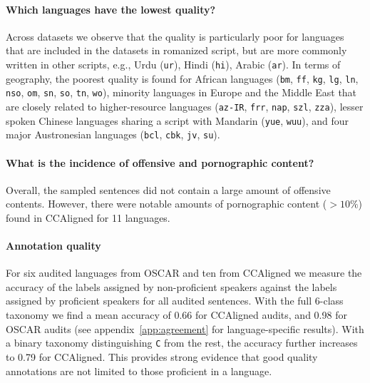 \paragraph{Which languages have the lowest quality?} Across datasets we observe that the quality is particularly poor for languages that are included in the datasets in romanized script, but are more commonly written in other scripts, e.g., Urdu (\texttt{ur}), Hindi (\texttt{hi}), Arabic (\texttt{ar}). %
In terms of geography, the poorest quality is found for African languages (\texttt{bm}, \texttt{ff}, \texttt{kg}, \texttt{lg}, \texttt{ln}, \texttt{nso}, \texttt{om}, \texttt{sn}, \texttt{so}, \texttt{tn}, \texttt{wo}), minority languages in Europe and the Middle East that are closely related to higher-resource languages (\texttt{az-IR}, \texttt{frr}, \texttt{nap}, \texttt{szl}, \texttt{zza}), lesser spoken Chinese languages sharing a script with Mandarin (\texttt{yue}, \texttt{wuu}), and four major Austronesian languages (\texttt{bcl}, \texttt{cbk}, \texttt{jv}, \texttt{su}).

\paragraph{What is the incidence of offensive and pornographic content?}
Overall, the sampled sentences did not contain a large amount of offensive contents. However, there were notable amounts of pornographic content ($>10\%$) found in CCAligned for 11 languages. %

\paragraph{Annotation quality}
For six audited languages from OSCAR and ten from CCAligned we measure the accuracy of the labels assigned by non-proficient speakers against the labels assigned by proficient speakers for all audited sentences. With the full 6-class taxonomy we find a mean accuracy of 0.66
for CCAligned audits, and 0.98
for OSCAR audits (see appendix~\ref{app:agreement} for language-specific results). With a binary taxonomy distinguishing \texttt{C} from the rest, the accuracy further increases to 0.79
for CCAligned. This provides strong evidence that good quality annotations are not limited to those proficient in a language.

